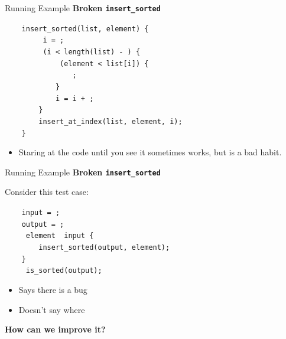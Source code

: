\documentclass[xcolor=dvipsnames]{beamer}
\begin{document}
\begin{frame}{Running Example}
	\textbf{Broken \texttt{insert\_sorted}}

	\linegap
		\texttt{~~~~insert\_sorted(list,~element)~\{} \\
			\texttt{~~~~~~~~~i~=~;} \\
			\texttt{~~~~~~~~~(i~<~length(list)~-~)~\{} \\
		\texttt{~~~~~~~~~~~~~(element~<~list[i])~\{} \\
		\texttt{~~~~~~~~~~~~~~~~;} \\
		\texttt{~~~~~~~~~~~~\}} \\
		\texttt{~~~~~~~~~~~~i = i + ;} \\
		\texttt{~~~~~~~~\}} \\
		\texttt{~~~~~~~~insert\_at\_index(list,~element,~i);} \\
		\texttt{~~~~\}} \\
	\pause
	\linegap
	\begin{itemize}
		\item Staring at the code until you see it sometimes works, but is a bad habit.
	\end{itemize}
\end{frame}

\begin{frame}{Running Example}
	\textbf{Broken \texttt{insert\_sorted}}

	\linegap
	Consider this test case:

	\linegap
		\texttt{~~~~input~=~;} \\
		\texttt{~~~~output~=~;} \\
		\texttt{~~~~~element~~input~\{} \\
		\texttt{~~~~~~~~insert\_sorted(output,~element);} \\
		\texttt{~~~~\}} \\
		\texttt{~~~~~is\_sorted(output);~} \\
	\linegap

	\pause
	\begin{itemize}
		\item Says there is a bug
		\item Doesn't say where
	\end{itemize}
	\pause
	{\bf How can we improve it?}
\end{frame}
\end{document}
